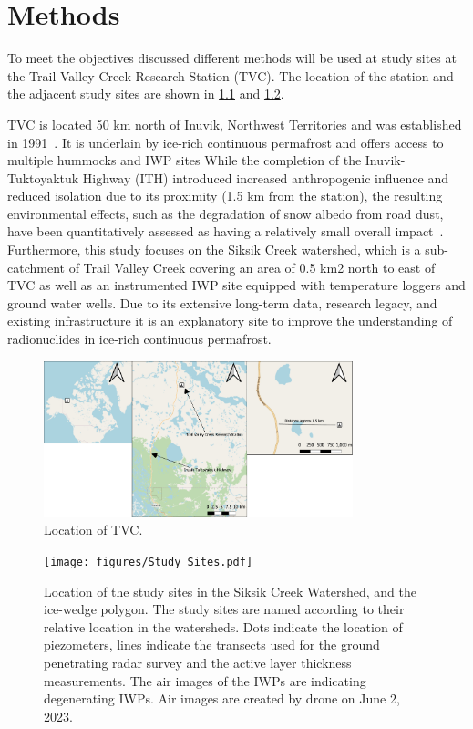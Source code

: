 \chapter{Methods}
To meet the objectives discussed different methods will be used at study sites at the Trail Valley Creek Research Station (TVC). 
The location of the station and the adjacent study sites are shown in \cref{fig:study_site_overview} and \cref{fig:study_sites}.

TVC is located 50 km north of Inuvik, Northwest Territories and was established in 1991~\citep{trailvalleycreekTrailValleyCreek2025}. 
It is underlain by ice-rich continuous permafrost and offers access to multiple hummocks and IWP sites While the completion of the Inuvik-Tuktoyaktuk Highway (ITH) introduced increased anthropogenic influence and reduced isolation due to its proximity (1.5 km from the station), the resulting environmental effects, such as the degradation of snow albedo from road dust, have been quantitatively assessed as having a relatively small overall impact~\citep{hammarSnowAccumulationAlbedo2023}. 
Furthermore, this study focuses on the Siksik Creek watershed, which is a sub-catchment of Trail Valley Creek covering an area of 0.5 km2 north to east of TVC as well as an instrumented IWP site equipped with temperature loggers and ground water wells. 
Due to its extensive long-term data, research legacy, and existing infrastructure it is an explanatory site to improve the understanding of radionuclides in ice-rich continuous permafrost.
\begin{figure}[htbp]
    \centering
    \includegraphics[width=0.8\textwidth]{figures/Overview of Study Site.pdf}
    \caption{Location of TVC.}
    \label{fig:study_site_overview}
\end{figure}
\begin{figure}[htbp]
    \centering
    \texttt{[image: figures/Study Sites.pdf]}
    \caption{Location of the study sites in the Siksik Creek Watershed, and the ice-wedge polygon. 
            The study sites are named according to their relative location in the watersheds. 
            Dots indicate the location of piezometers, lines indicate the transects used for the ground penetrating radar survey and the active layer thickness measurements. 
            The air images of the IWPs are indicating degenerating IWPs. Air images are created by drone on June 2, 2023.}
    \label{fig:study_sites}
\end{figure}
